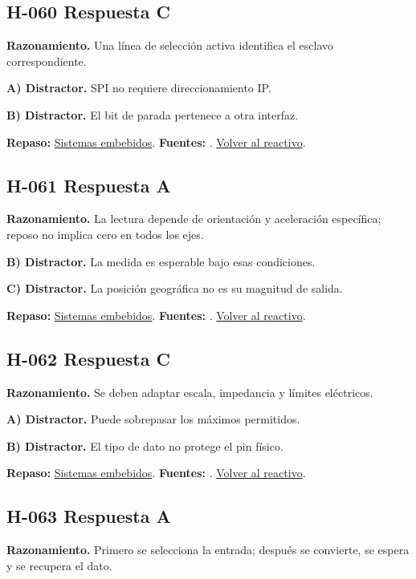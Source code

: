 \subsection*{H-060 \quad Respuesta C}\label{s:H-060}
\textbf{Razonamiento.} Una línea de selección activa identifica el esclavo correspondiente.

\textbf{A) Distractor. }SPI no requiere direccionamiento IP.

\textbf{B) Distractor. }El bit de parada pertenece a otra interfaz.

\textbf{Repaso:} \hyperref[sec:h3]{Sistemas embebidos}. \textbf{Fuentes:} \cite{avr,arduino,sensors}. \hyperref[q:H-060]{Volver al reactivo}.\par\medskip

\subsection*{H-061 \quad Respuesta A}\label{s:H-061}
\textbf{Razonamiento.} La lectura depende de orientación y aceleración específica; reposo no implica cero en todos los ejes.

\textbf{B) Distractor. }La medida es esperable bajo esas condiciones.

\textbf{C) Distractor. }La posición geográfica no es su magnitud de salida.

\textbf{Repaso:} \hyperref[sec:h3]{Sistemas embebidos}. \textbf{Fuentes:} \cite{avr,arduino,sensors}. \hyperref[q:H-061]{Volver al reactivo}.\par\medskip

\subsection*{H-062 \quad Respuesta C}\label{s:H-062}
\textbf{Razonamiento.} Se deben adaptar escala, impedancia y límites eléctricos.

\textbf{A) Distractor. }Puede sobrepasar los máximos permitidos.

\textbf{B) Distractor. }El tipo de dato no protege el pin físico.

\textbf{Repaso:} \hyperref[sec:h3]{Sistemas embebidos}. \textbf{Fuentes:} \cite{avr,arduino,sensors}. \hyperref[q:H-062]{Volver al reactivo}.\par\medskip

\subsection*{H-063 \quad Respuesta A}\label{s:H-063}
\textbf{Razonamiento.} Primero se selecciona la entrada; después se convierte, se espera y se recupera el dato.

